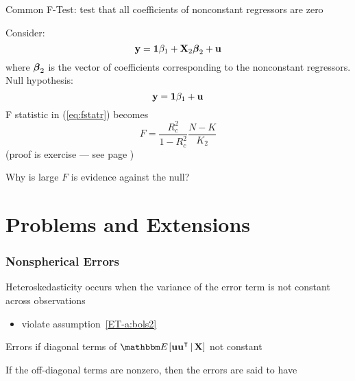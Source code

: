 \begin{frame}
    
    \vspace{2em}
    Common F-Test: test that all coefficients 
    of nonconstant regressors are zero
    
    Consider:
    \begin{equation*}
        {\mathbf y} = {\mathbf 1} \beta_1 + \mathbf X_2 {\boldsymbol \beta}_2  + {\mathbf u}
    \end{equation*}
    where ${\boldsymbol \beta}_2$ is the vector of coefficients corresponding to the
    nonconstant regressors. Null hypothesis:
    \begin{equation*}
        {\mathbf y} = {\mathbf 1} \beta_1  + {\mathbf u}
    \end{equation*}
    F
    statistic in (\ref{eq:fstatr}) becomes
    \begin{equation*}
        \label{eq:fstat2}
        F = \frac{R^2_c}{1 - R^2_c} \frac{N - K}{K_2}
    \end{equation*}
    (proof is exercise --- see page \pageref{ET-eq:fstat2})
        
    Why is large $F$ is evidence against the
    null?
    
\end{frame}


\section{Problems and Extensions}

\begin{frame}\frametitle{Nonspherical Errors}

    \vspace{2em}
    Heteroskedasticity occurs when the variance of the error term is
    not constant
    across observations
    \begin{itemize}
        \item violate assumption~\ref{ET-a:bols2}
    \end{itemize}
    
    \vspace{.7em}
    Errors  if diagonal terms
    of $\EE [ \boldu \boldu^\T \given \boldX ]$ not constant
    
    If the
    off-diagonal terms are nonzero, then the errors are said to have 

\end{frame}

